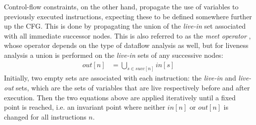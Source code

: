 \documentclass{article}
\begin{document}
Control-flow constraints, on the other hand, propagate the use of variables to previously executed instructions, expecting these to be defined somewhere further up the CFG. This is done by propagating the union of the \textit{live-in} set associated with all immediate successor nodes. This is also referred to as the \textit{meet operator} \cite[605]{dragon}, whose operator depends on the type of dataflow analysis as well, but for liveness analysis a union is performed on the \textit{live-in} sets of  any successive  nodes:
\begin{align}\label{flowout}
  \mathit{out}\left[n\right] &= \bigcup_{s\in \mathit{succ}\left[n\right]} \mathit{in}\left[s\right]
\end{align}
Initially, two empty sets are associated with each instruction: the \textit{live-in} and \textit{live-out} sets, which are the sets of variables that are live respectively before and after execution. Then the two equations above are applied iteratively until a fixed point is reached, i.e. an invariant point where neither \(\mathit{in}[n]\) or \(\mathit{out}[n]\) is changed for all instructions \(n\).






\end{document}
